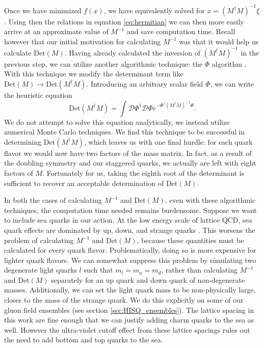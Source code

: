 Once we have minimized $f(x)$, we have equivalently solved for $x = (M^\dagger M)^{-1}\xi$.  Using then the relations in equation \ref{eq:hermitian} we can then more easily arrive at an approximate value of $M^{-1}$ and save computation time.  Recall however that our initial motivation for calculating $M^{-1}$ was that it would help us calculate $\mathrm{Det}(M)$. Having already calculated the inversion of $(M^\dagger M)^{-1}$ in the previous step, we can utilize another algorithmic technique: the $\Phi$ algorithm \cite{PhysRevD.35.2531}.  With this technique we modify the determinant term like $\mathrm{Det}(M)\rightarrow \mathrm{Det}(M^\dagger M)$.  Introducing an arbitrary scalar field $\Phi$, we can write the heuristic equation
 \begin{equation}\label{eq:detMdaggerM}
     \mathrm{Det}(M^\dagger M) = \int \mathcal{D}\Phi^\dagger\mathcal{D}\Phi
     e^{-\Phi^\dagger(M^\dagger M)^{-1}\Phi}.
 \end{equation}
We do not attempt to solve this equation analytically, we instead utilize numerical Monte Carlo techniques.  We find this technique to be successful in determining $\mathrm{Det}(M^\dagger M)$, which leaves us with one final hurdle: for each quark flavor we would now have two factors of the mass matrix.  In fact, as a result of the doubling symmetry and our staggered quarks, we actually are left with eight factors of $M$.  Fortunately for us, taking the eighth root of the determinant is sufficient to recover an acceptable determination of $\mathrm{Det}(M)$.  

In both the cases of calculating $M^{-1}$ and $\mathrm{Det}(M)$, even with these algorithmic techniques, the computation time needed remains burdensome.  Suppose we want to include sea quarks in our action.  At the low energy scale of lattice QCD, sea quark effects are dominated by up, down, and strange quarks \cite{Appelquist:1974tg}.  This worsens the problem of calculating $M^{-1}$ and $\mathrm{Det}(M)$, because these quantities must be calculated for every quark flavor.  Problematically, doing so is more expensive for lighter quark flavors. We can somewhat suppress this problem by simulating two degenerate light quarks $l$ such that $m_l = m_u = m_d$, rather than calculating $M^{-1}$ and $\mathrm{Det}(M)$ separately for an up quark and down quark of non-degenerate masses.  Additionally, we can set the light quark mass to be non-physically large, closer to the mass of the strange quark.  We do this explicitly on some of our gluon field ensembles (see section \ref{sec:HISQ_ensembles}).  The lattice spacing in this work are fine enough that we can justify adding charm quarks to the sea as well.  However the ultra-violet cutoff effect from these lattice spacings rules out the need to add bottom and top quarks to the sea.
  

